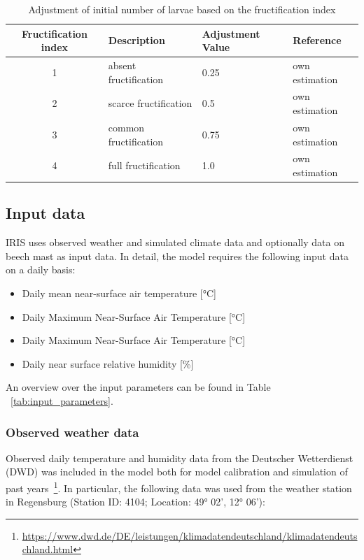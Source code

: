 \documentclass[a4paper, 11pt]{scrartcl}
\begin{document}
\begin{table}[h!]
\caption{Adjustment of initial number of larvae based on the fructification index}
\label{tab:fructification_adjustment}
\begin{tabularx}{\textwidth}{@{}clll@{}}
\toprule
\textbf{Fructification index} & \textbf{Description}    & \textbf{Adjustment Value} & \textbf{Reference} \\
\midrule
1				 	  		  & absent fructification 	& 	0.25 & own estimation \\
2 				 	  		  & scarce fructification	&	0.5	& own estimation  \\
3 					  		  & common fructification	& 	0.75 & own estimation \\
4					 		  & full fructification 	& 	1.0	& own estimation  \\
\bottomrule
\end{tabularx}
\end{table}

\subsection{Input data}\label{input_data}
IRIS uses observed weather and simulated climate data and optionally data on beech mast as input data. In detail, the model requires the following input data on a daily basis:

\begin{itemize}[noitemsep]
\item Daily mean near-surface air temperature [°C]
\item Daily Maximum Near-Surface Air Temperature [°C]
\item Daily Maximum Near-Surface Air Temperature [°C]
\item Daily near surface relative humidity [\%]
\end{itemize}

An overview over the input parameters can be found in Table ~\ref{tab:input_parameters}.

\subsubsection{Observed weather data}
Observed daily temperature and humidity data from the Deutscher Wetterdienst (DWD) was included in the model both for model calibration and simulation of past years~\footnote{\url{https://www.dwd.de/DE/leistungen/klimadatendeutschland/klimadatendeutschland.html}}. In particular, the following data was used from the weather station in Regensburg (Station ID: 4104; Location: 49° 02', 12° 06'):
\end{document}
